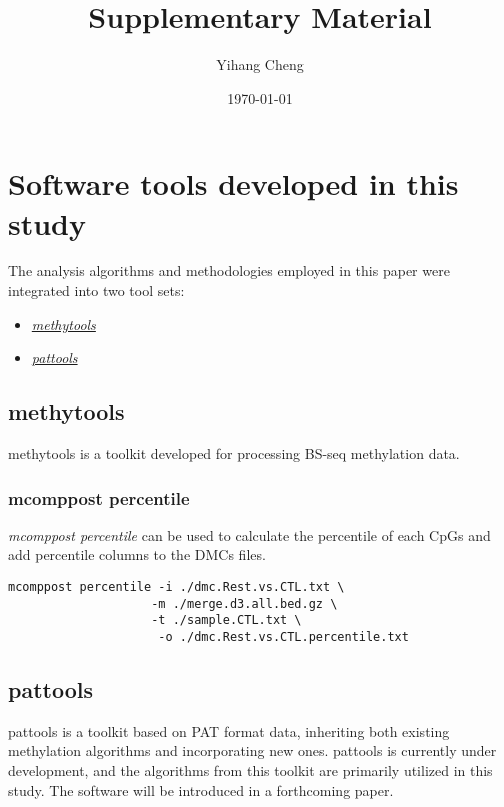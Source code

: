 \documentclass[12pt,letterpaper]{article}
\title{Supplementary Material}
\author{Yihang Cheng}
\date{\today}
\begin{document}
\maketitle
\newpage
\tableofcontents
\newpage
\section{Software tools developed in this study}\label{sec:software-develope}
The analysis algorithms and methodologies employed in this paper were integrated into two tool sets:

\begin{itemize}
    \item  \href{https://github.com/hcyvan/epiLungCancer/tree/main/methytools}{\textit{methytools}}
    \item \href{https://github.com/hcyvan/pattools}{\textit{pattools}}
\end{itemize}

\subsection{methytools}\label{sec:software-develope-methytools}

methytools is a toolkit developed for processing BS-seq methylation data.

\subsubsection{mcomppost percentile}

\emph{mcomppost percentile} can be used to calculate the percentile of each CpGs and add percentile columns to the DMCs files.

\begin{verbatim}
mcomppost percentile -i ./dmc.Rest.vs.CTL.txt \
                    -m ./merge.d3.all.bed.gz \
                    -t ./sample.CTL.txt \
                     -o ./dmc.Rest.vs.CTL.percentile.txt
\end{verbatim}

\subsection{pattools}\label{sec:software-develope-pattools}

pattools is a toolkit based on PAT format\cite{Loyfer2024.05.08.593132} data, inheriting both existing
methylation algorithms and incorporating new ones.
    {pattools} is currently under development, and the algorithms from this toolkit are primarily utilized
in this study. The software will be introduced in a forthcoming paper.
\end{document}
